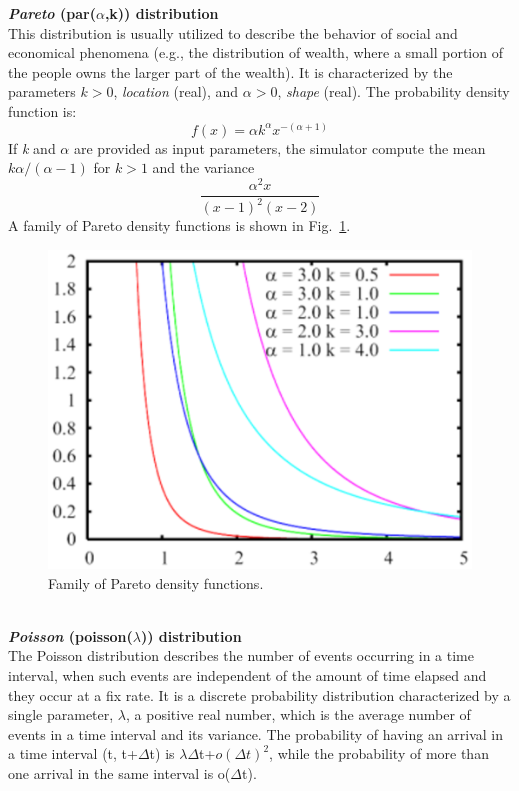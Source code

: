 \textbf{\emph{Pareto} (par($\alpha$,k)) distribution}\\
 This
distribution is usually utilized to describe the behavior of
social and economical phenomena (e.g., the distribution of wealth,
where a small portion of the people owns the larger part of the
wealth). It is characterized by the parameters $k>0$, \emph{location}
(real), and $\alpha>0$, \emph{shape} (real). The probability density
function is:
\[ f(x) = \alpha k^\alpha x^{-(\alpha + 1)  }
\]
If \emph{k} and $\alpha$ are provided as input parameters, the simulator
compute the mean  $k \alpha/(\alpha - 1)$ for $k>1$ and the
variance
\[ \frac{\alpha^2 x }{(x-1)^2 (x-2)}
\]
A family of Pareto density functions is shown in
Fig.~\ref{fig:famPar}.
\begin{figure}[htb]
    \begin{center}
        \includegraphics[scale=.5]{img/jsimg/4.10.eps}
    \end{center}
    \caption{Family of Pareto density functions.}
    \label{fig:famPar}
\end{figure}\\

\textbf{\emph{Poisson} (poisson($\lambda$)) distribution}\\
The Poisson distribution describes the number of events occurring
in a time interval, when such events are independent of the amount
of time elapsed and they occur at a fix rate. It is a discrete
probability distribution characterized by a single parameter,
$\lambda$, a positive real number, which is the average number of
events in a time interval and its variance. The probability of
having an arrival in a time interval (t, t+$\Delta$t) is $\lambda
\Delta$t+{$o(\Delta t)^2$}, while the probability of more than one
arrival in the same interval is o($\Delta$t).

